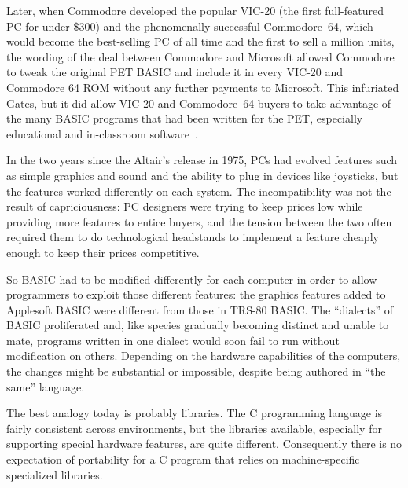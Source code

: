 Later, when Commodore developed the popular VIC-20 (the first
full-featured PC for under \$300) and the phenomenally successful
Commodore~64, which would become the best-selling PC of all time and the
first to sell a million units, the wording of the deal between Commodore
and Microsoft allowed Commodore to tweak the original PET BASIC and
include it in every VIC-20 and Commodore 64 ROM without any further
payments to Microsoft.
This infuriated Gates, but it did allow VIC-20 and Commodore~64 buyers
to take advantage of the many BASIC programs that had been written for
the PET, especially educational and in-classroom
software~\cite[p. 414]{commodore}.


In the two years since the Altair's release in 1975, PCs had evolved 
features such as simple graphics
and sound and the ability to plug in devices like joysticks, but the
features worked differently on each system.  The incompatibility was not
the result of capriciousness: PC designers were trying to keep prices
low while providing more features to entice buyers, and the tension
between the two often required them to do technological headstands to
implement a feature cheaply enough to keep their prices competitive.

So BASIC had to be modified differently for each computer in order to
allow programmers to exploit those different features: the graphics
features added to Applesoft BASIC were different from those in TRS-80
BASIC.
  The
``dialects'' of BASIC proliferated and, like species gradually becoming
distinct and unable to mate, programs written in one dialect would soon
fail to run without modification on others.  Depending on the hardware
capabilities of the computers, the changes might be substantial or
impossible,
despite being authored in ``the same'' language.

\begin{tangent}
The best analogy today is probably libraries.  The C programming
language is fairly consistent across environments, but the libraries
available, especially for supporting special hardware features, are
quite different.  Consequently there is no expectation of portability
for a C program 
that relies on machine-specific specialized libraries.
\end{tangent}


